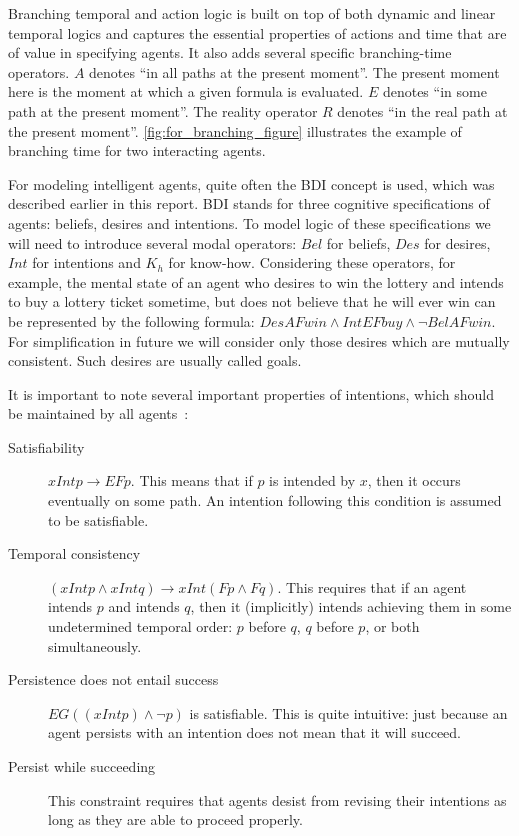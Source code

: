 Branching temporal and action logic is built on top of both dynamic and linear temporal logics and captures the essential properties of actions and time that are of value in specifying agents.
It also adds several specific branching-time operators.
$A$ denotes \enquote{in all paths at the present moment}.
The present moment here is the moment at which a given formula is evaluated.
$E$ denotes \enquote{in some path at the present moment}.
The reality operator $R$ denotes \enquote{in the real path at the present moment}.
\autoref{fig:for_branching_figure} illustrates the example of branching time for two interacting agents.

For modeling intelligent agents, quite often the BDI concept is used, which was described earlier in this report.
BDI stands for three cognitive specifications of agents: beliefs, desires and intentions.
To model logic of these specifications we will need to introduce several modal operators: $Bel$ for beliefs, $Des$ for desires, $Int$ for intentions and $K_h$ for know-how.
Considering these operators, for example, the mental state of an agent who desires to win the lottery and intends to buy a lottery ticket sometime, but does not believe that he will ever win can be represented by the following formula: $DesAFwin \land IntEFbuy \land \neg BelAFwin$.
For simplification in future we will consider only those desires which are mutually consistent.
Such desires are usually called goals.

It is important to note several important properties of intentions, which should be maintained by all agents~\cite{Singh_92}:
\begin{description}
  \item[Satisfiability] $xIntp\rightarrow EFp$.
    This means that if $p$ is intended by $x$, then it occurs eventually on some path.
    An intention following this condition is assumed to be satisfiable.
  \item[Temporal consistency] $(xIntp \land xIntq)\rightarrow xInt(Fp \land Fq)$.
    This requires that if an agent intends $p$ and intends $q$, then it (implicitly) intends achieving them in some undetermined temporal order: $p$ before $q$, $q$ before $p$, or both simultaneously.
  \item[Persistence does not entail success] $EG((xIntp) \land \neg p)$ is satisfiable.
    This is quite intuitive: just because an agent persists with an intention does not mean that it will succeed.
  \item[Persist while succeeding] This constraint requires that agents desist from revising their intentions as long as they are able to proceed properly.
\end{description}

